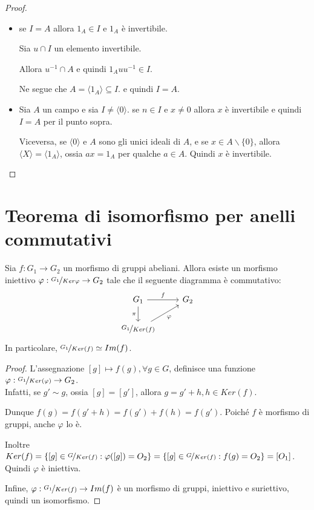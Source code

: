 \documentclass[10pt,a4paper,twoside]{book}
\begin{document}
\begin{proof}
    \
    \begin{itemize}
        \item se $I = A$ allora $1_A \in I$ e $1_A$ è invertibile.

              Sia $u \cap I$ un elemento invertibile.

              Allora $u^{-1} \cap A$ e quindi $1_A u u^{-1} \in I$.

              Ne segue che $A = \langle 1_A \rangle \subseteq I$. e quindi $I = A$.
        \item Sia $A$ un campo e sia $I \neq \langle 0 \rangle$. se $ n \in I$ e $x \neq 0$ allora $x$ è invertibile e quindi $I = A$
              per il punto sopra.

              Viceversa, se $\langle 0 \rangle$ e $A$ sono gli unici ideali di $A$,
              e se $x \in A  \backslash \{0\}$, allora $\langle X \rangle = \langle 1_A \rangle$, ossia $ax = 1_A$ per qualche $a \in A$. Quindi $x$ è invertibile.
    \end{itemize}
\end{proof}
\newpage


\section{Teorema di isomorfismo per anelli commutativi}

\begin{theorem}
    Sia $f: G_1 \rightarrow G_2$ un morfismo di gruppi abeliani. Allora esiste un morfismo iniettivo $\varphi : \nicefrac{G_1}{Ker \varphi} \rightarrow G_2$ tale che il seguente diagramma è commutativo:
    \begin{equation*}
        \begin{tikzcd}
            G_1 \arrow[r, "f"] \arrow[d, "\pi"'] & G_2 \\
            \nicefrac{G_1}{Ker(f)} \arrow[ru, "\varphi"']
        \end{tikzcd}
    \end{equation*}
    In particolare, $\nicefrac{G_1}{Ker(f)} \simeq Im(f)$.
\end{theorem}

\begin{proof}
    L'assegnazione $[g] \mapsto f(g), \forall g \in  G$, definisce una funzione $\varphi : \nicefrac{G_1}{Ker(\varphi)}
        \rightarrow G_2$.\\
    Infatti, se $g' \sim g$, ossia $[g]  = [g']$, allora $g = g' + h , h \in Ker(f)$.

    Dunque $f(g) = f(g' + h) = f(g') + f(h) = f(g')$. Poiché $f$ è morfismo di gruppi, anche $\varphi$ lo è.

    Inoltre $Ker(f) = \{[g] \in \nicefrac{G}{Ker(f)} : \varphi([g]) = O_2\}=\{[g] \in  \nicefrac{G}{Ker(f)} : f(g) = O_2\} = {[O_1]}$. Quindi $\varphi$ è iniettiva.

    Infine, $ \varphi : \nicefrac{G_1}{Ker(f)} \rightarrow Im(f)$ è un morfismo di gruppi, iniettivo e suriettivo, quindi un isomorfismo.
\end{proof}
\end{document}
